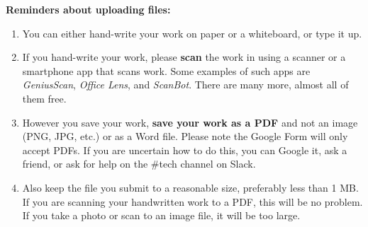 \documentclass[11pt]{article}
\begin{document}
\vspace{0.5in}

\noindent
\textbf{Reminders about uploading files:}
\begin{enumerate}
    \item You can either hand-write your work on paper or a whiteboard, or type it up. 
    \item If you hand-write your work, please \textbf{scan} the work in using a scanner or a smartphone app that scans work. Some examples of such apps are \textit{GeniusScan}, \textit{Office Lens}, and \textit{ScanBot}. There are many more, almost all of them free. 
    \item However you save your work, \textbf{save your work as a PDF} and not an image (PNG, JPG, etc.) or as a Word file. Please note the Google Form will only accept PDFs. If you are uncertain how to do this, you can Google it, ask a friend, or ask for help on the \#tech channel on Slack. 
    \item Also keep the file you submit to a reasonable size, preferably less than 1 MB. If you are scanning your handwritten work to a PDF, this will be no problem. If you take a photo or scan to an image file, it will be too large. 
\end{enumerate}
\end{document}
